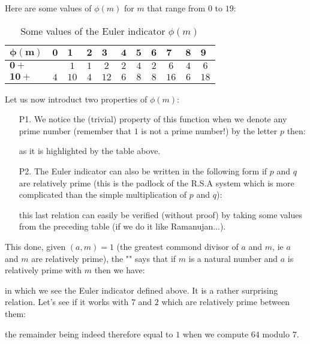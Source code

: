 	Here are some values of $\phi(m)$ for $m$ that range from $0$ to $19$:
	\begin{table}[]
		\centering
		\begin{tabular}{|l|l|c|c|c|c|c|c|c|c|c|}
		\hline
		\rowcolor[HTML]{C0C0C0} 
		$\pmb{\phi(m)}$ & $\pmb{0}$ & \multicolumn{1}{l|}{\cellcolor[HTML]{C0C0C0}$\pmb{1}$} & \multicolumn{1}{l|}{\cellcolor[HTML]{C0C0C0}$\pmb{2}$} & \multicolumn{1}{l|}{\cellcolor[HTML]{C0C0C0}$\pmb{3}$} & \multicolumn{1}{l|}{\cellcolor[HTML]{C0C0C0}$\pmb{4}$} & \multicolumn{1}{l|}{\cellcolor[HTML]{C0C0C0}$\pmb{5}$} & \multicolumn{1}{l|}{\cellcolor[HTML]{C0C0C0}$\pmb{6}$} & \multicolumn{1}{l|}{\cellcolor[HTML]{C0C0C0}$\pmb{7}$} & \multicolumn{1}{l|}{\cellcolor[HTML]{C0C0C0}$\pmb{8}$} & \multicolumn{1}{l|}{\cellcolor[HTML]{C0C0C0}$\pmb{9}$} \\ \hline
		\cellcolor[HTML]{C0C0C0}$\pmb{0+}$ &  & $1$ & $1$ & $2$ & $2$ & $4$ & $2$ & $6$ & $4$ & $6$ \\ \hline
		\cellcolor[HTML]{C0C0C0}$\pmb{10+}$ & \multicolumn{1}{c|}{$4$} & $10$ & $4$ & $12$ & $6$ & $8$ & $8$ & $16$ & $6$ & $18$ \\ \hline
		\end{tabular}
		\caption{Some values of the Euler indicator $\phi(m)$}
	\end{table}
	Let us now introduct two properties of $\phi(m)$:
	\begin{enumerate}
		\item[P1.] We notice the (trivial) property of this function when we denote any prime number (remember that $1$ is not a prime number!) by the letter $p$ then:
		
		as it is highlighted by the table above.
	
		\item[P2.] The Euler indicator can also be written in the following form if $p$ and $q$ are relatively prime (this is the padlock of the R.S.A system which is more complicated than the simple multiplication of $p$ and $q$):
		
		this last relation can easily be verified (without proof) by taking some values from the preceding table (if we do it like Ramanujan...).
	\end{enumerate}
	\begin{theorem}
	This done, given $(a,m)=1$ (the greatest commond divisor of $a$ and $m$, ie $a$ and $m$ are relatively prime), the "" says that if $m$ is a natural number and $a$ is relatively prime with $m$ then we have:
	
	in which we see the Euler indicator defined above. It is a rather surprising relation. Let's see if it works with $7$ and $2$ which are relatively prime between them:
	
	the remainder being indeed therefore equal to $1$ when we compute $64$ modulo $7$.
	\end{theorem}
